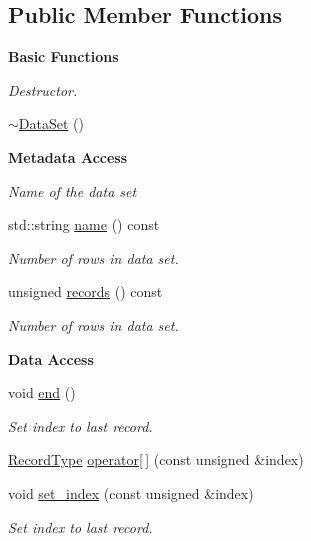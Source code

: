 \subsection*{Public Member Functions}
\begin{Indent}{\bf Basic Functions}\par
{\em \label{_amgrp2386c9a1f1785edee33f374dd2db9b3d}
 Destructor. }\begin{DoxyCompactItemize}
\item 
\hyperlink{classeos_1_1hdf5_1_1DataSet_a29e516f3d4d7e3a8375fe676f73715ec}{$\sim$DataSet} ()
\end{DoxyCompactItemize}
\end{Indent}
\begin{Indent}{\bf Metadata Access}\par
{\em \label{_amgrp201d8776b1bbde9932c65b9f34008fb7}
 Name of the data set }\begin{DoxyCompactItemize}
\item 
std::string \hyperlink{classeos_1_1hdf5_1_1DataSet_a4ab5c04c21708d32eb7c36120f99b989}{name} () const 
\begin{DoxyCompactList}\small\item\em Number of rows in data set. \item\end{DoxyCompactList}\item 
unsigned \hyperlink{classeos_1_1hdf5_1_1DataSet_af19723594ac6d14c327f90821187b14c}{records} () const 
\begin{DoxyCompactList}\small\item\em Number of rows in data set. \item\end{DoxyCompactList}\end{DoxyCompactItemize}
\end{Indent}
\begin{Indent}{\bf Data Access}\par
{\em \label{_amgrpf8aacfa5c683858912c498f517c9b457}
 }\begin{DoxyCompactItemize}
\item 
void \hyperlink{classeos_1_1hdf5_1_1DataSet_a701084cc09483dc77579178d05b1aa35}{end} ()
\begin{DoxyCompactList}\small\item\em Set index to last record. \item\end{DoxyCompactList}\item 
\hyperlink{classeos_1_1hdf5_1_1DataSet_a010bb09725c4d84df2db7f60e0a88a1f}{RecordType} \hyperlink{classeos_1_1hdf5_1_1DataSet_a61acdb337452f42d2bd2f3ccdee989f6}{operator\mbox{[}$\,$\mbox{]}} (const unsigned \&index)
\item 
void \hyperlink{classeos_1_1hdf5_1_1DataSet_ac0a8fc9de491f3cd8b5ffd625ac1728a}{set\_\-index} (const unsigned \&index)
\begin{DoxyCompactList}\small\item\em Set index to last record. \item\end{DoxyCompactList}\end{DoxyCompactItemize}
\end{Indent}

